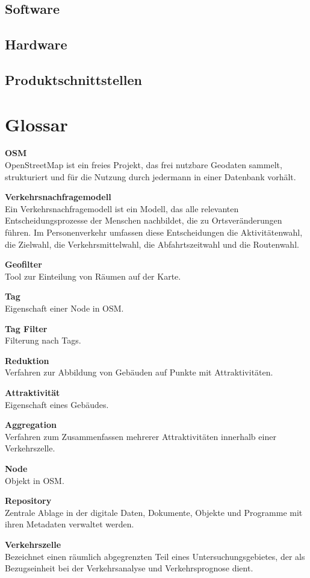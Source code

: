 \documentclass[parskip=full]{scrartcl} %
\begin{document}
\subsection{Software}
\subsection{Hardware}
\subsection{Produktschnittstellen}

\section{Glossar}
\textbf{OSM}\\
OpenStreetMap ist ein freies Projekt, das frei nutzbare Geodaten sammelt, strukturiert und für die Nutzung durch jedermann in einer Datenbank vorhält.

\textbf{Verkehrsnachfragemodell}\\
Ein Verkehrsnachfragemodell ist ein Modell, das alle relevanten Entscheidungsprozesse der Menschen nachbildet, die zu Ortsveränderungen führen. Im Personenverkehr umfassen diese Entscheidungen die Aktivitätenwahl, die Zielwahl, die Verkehrsmittelwahl, die Abfahrtszeitwahl und die Routenwahl.

\textbf{Geofilter}\\
Tool zur Einteilung von Räumen auf der Karte.

\textbf{Tag}\\
Eigenschaft einer Node in OSM.

\textbf{Tag Filter}\\
Filterung nach Tags.

\textbf{Reduktion}\\
Verfahren zur Abbildung von Gebäuden auf Punkte mit Attraktivitäten.

\textbf{Attraktivität}\\
Eigenschaft eines Gebäudes.

\textbf{Aggregation}\\
Verfahren zum Zusammenfassen mehrerer Attraktivitäten innerhalb einer Verkehrszelle.

\textbf{Node}\\
Objekt in OSM.

\textbf{Repository}\\
Zentrale Ablage in der digitale Daten, Dokumente, Objekte und Programme mit ihren Metadaten verwaltet werden.

\textbf{Verkehrszelle}\\
Bezeichnet einen räumlich abgegrenzten Teil eines Untersuchungsgebietes, der als Bezugseinheit bei der Verkehrsanalyse und Verkehrsprognose dient.

\newpage
\end{document}

